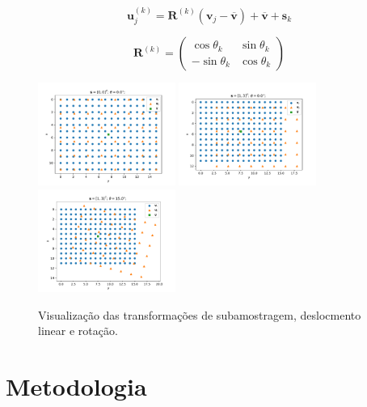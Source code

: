 \documentclass[12pt,openright,oneside,a4paper,english,brazil]{abntex2}
\begin{document}
\begin{equation}
	\label{eq:psfcenter}
	\mathbf{u}^{(k)}_j = \mathbf{R}^{(k)}(\mathbf{v}_j-\mathbf{\overline{v}})+\mathbf{\overline{v}}+\mathbf{s}_k
\end{equation}

\begin{equation}
	\mathbf{R}^{(k)} = 
	\begin{pmatrix}
		\cos \theta_k & \sin \theta_k \\
		- \sin \theta_k & \cos \theta_k
	\end{pmatrix}
\end{equation}

\begin{figure}
	\centering
	\includegraphics[width=0.4\textwidth]{./figures/transform1.pdf}
	\includegraphics[width=0.4\textwidth]{./figures/transform2.pdf}
	\includegraphics[width=0.4\textwidth]{./figures/transform3.pdf}
	\caption{Visualização das transformações de subamostragem, deslocmento linear e rotação.}
	\label{fig:transformations}
\end{figure}

\chapter{Metodologia}
\end{document}
